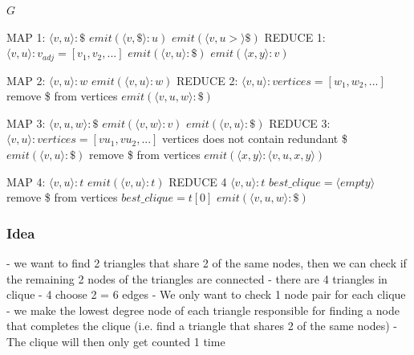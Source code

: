 \documentclass{article}
\begin{document}
\begin{algorithm}
\caption{$mr\_strong\_4clique\_finder$}
\begin{algorithmic}
\REQUIRE $G$
	
\REQUIRE MAP 1: $\langle v,u\rangle :\$$
		\STATE $emit(\langle v,\$\rangle :u)$
		\STATE $emit(\langle v,u>\rangle \$)$
	\ENDIF
\REQUIRE REDUCE 1: $\langle v,u\rangle :v_{adj} = [v_1,v_2,...]$
		\STATE $emit(\langle v,u \rangle:\$)$
				\STATE $emit(\langle x,y\rangle :v)$
				\ENDIF
			\ENDFOR
		\ENDFOR
	\ENDIF

\REQUIRE MAP 2: $\langle v,u\rangle :w$
	\STATE $emit(\langle v,u\rangle :w)$
\REQUIRE REDUCE 2: $\langle v,u\rangle : vertices = [w_1,w_2,...]$
		\STATE remove \$ from vertices
			\STATE $emit(\langle v,u,w\rangle :\$)$
		\ENDIF
	\ENDIF

\REQUIRE MAP 3: $\langle v,u,w\rangle :\$$
		\STATE $emit(\langle v,w \rangle :v)$
		\STATE $emit(\langle v,u \rangle :\$)$
	\ENDIF
\REQUIRE REDUCE 3: $\langle v,u\rangle :vertices = [vu_1,vu_2,...]$
	\ENSURE vertices does not contain redundant \$
			\STATE $emit(\langle v,u\rangle :\$)$
			\STATE remove \$ from vertices
		\ENDIF
	\ENDFOR
				\STATE $emit(\langle x,y\rangle :\langle v,u,x,y\rangle)$
			\ENDIF
		\ENDFOR
	\ENDFOR

\REQUIRE MAP 4: $\langle v,u\rangle :t$
	\STATE $emit(\langle v,u\rangle :t)$
\REQUIRE REDUCE 4 $\langle v,u\rangle :t$
	\STATE $best\_clique = \langle empty\rangle$
		\STATE remove \$ from vertices
				\STATE $best\_clique = t[0]$
			\ENDIF
			\STATE $emit(\langle v,u,w\rangle :\$)$
		\ENDIF
	\ENDIF
\end{algorithmic}
\end{algorithm}

\subsubsection{Idea}
- we want to find 2 triangles that share 2 of the same nodes, then we can check if the remaining 2 nodes of the triangles are connected
- there are 4 triangles in clique - 4 choose 2 = 6 edges
- We only want to check 1 node pair for each clique
- we make the lowest degree node of each triangle responsible for finding a node that completes the clique (i.e. find a triangle that shares 2 of the same nodes)
- The clique will then only get counted 1 time
\end{document}
